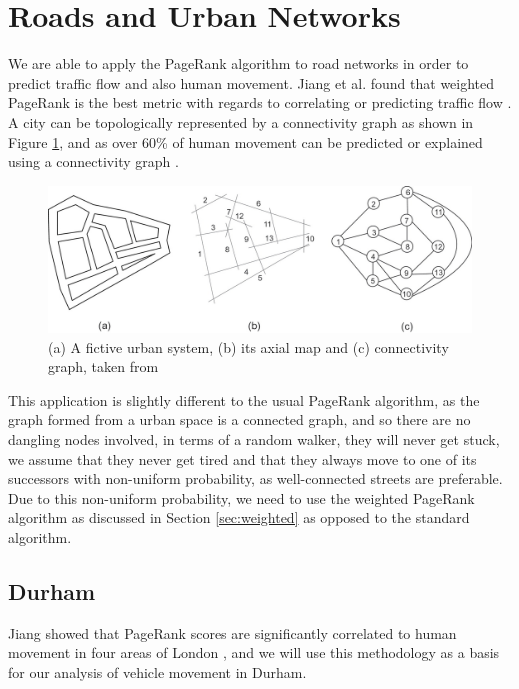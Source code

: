 \documentclass[11pt]{report}
\begin{document}

\section{Roads and Urban Networks}
We are able to apply the PageRank algorithm to road networks in order to predict traffic flow and also human movement. Jiang et al. found that weighted PageRank is the best metric with regards to correlating or predicting traffic flow \cite{1742-5468-2008-07-P07008}. A city can be topologically represented by a connectivity graph as shown in Figure \ref{city rep}, and as over 60\% of human movement can be predicted or explained using a connectivity graph \cite{doi:10.1080/13658810802022822}.

\begin{figure}[h]
\centering
\includegraphics[width=\linewidth]{map_view.jpeg}
\caption{(a) A fictive urban system, (b) its axial map and (c) connectivity graph, taken from \cite{doi:10.1080/13658810802022822}}
\label{city rep}
\end{figure}

This application is slightly different to the usual PageRank algorithm, as the graph formed from a urban space is a connected graph, and so there are no dangling nodes involved, in terms of a random walker, they will never get stuck, we assume that they never get tired and that they always move to one of its successors with non-uniform probability, as well-connected streets are preferable. Due to this non-uniform probability, we need to use the weighted PageRank algorithm as discussed in Section \ref{sec:weighted} as opposed to the standard algorithm.



\subsection{Durham}
Jiang showed that PageRank scores are significantly correlated to human movement in four areas of London \cite{doi:10.1080/13658810802022822}, and we will use this methodology as a basis for our analysis of vehicle movement in Durham. 
\end{document}
